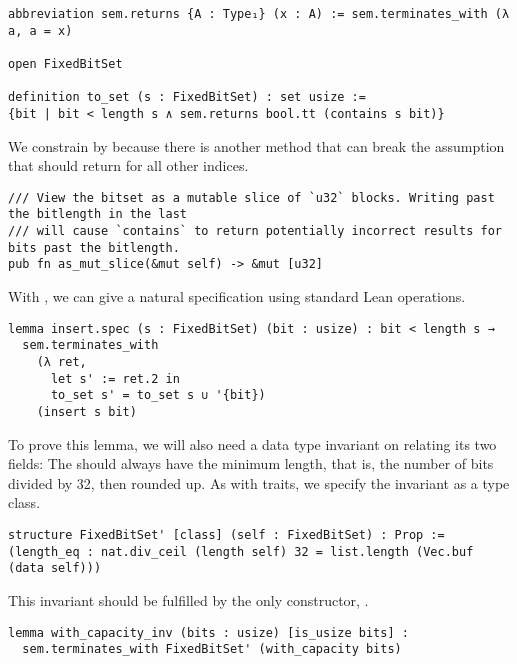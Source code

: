 \begin{verbatim}
abbreviation sem.returns {A : Type₁} (x : A) := sem.terminates_with (λ a, a = x)

open FixedBitSet

definition to_set (s : FixedBitSet) : set usize :=
{bit | bit < length s ∧ sem.returns bool.tt (contains s bit)}
\end{verbatim}

We constrain  by  because there is another method
that can break the assumption that  should return 
for all other indices.

\begin{verbatim}
/// View the bitset as a mutable slice of `u32` blocks. Writing past the bitlength in the last
/// will cause `contains` to return potentially incorrect results for bits past the bitlength.
pub fn as_mut_slice(&mut self) -> &mut [u32]
\end{verbatim}

With , we can give  a natural specification using
standard Lean  operations.

\begin{verbatim}
lemma insert.spec (s : FixedBitSet) (bit : usize) : bit < length s →
  sem.terminates_with
    (λ ret,
      let s' := ret.2 in
      to_set s' = to_set s ∪ '{bit})
    (insert s bit)
\end{verbatim}

To prove this lemma, we will also need a data type invariant on  relating its two
fields: The  should always have the minimum length, that is, the
number of bits divided by 32, then rounded up. As with traits, we specify the
invariant as a type class.

\begin{verbatim}
structure FixedBitSet' [class] (self : FixedBitSet) : Prop :=
(length_eq : nat.div_ceil (length self) 32 = list.length (Vec.buf (data self)))
\end{verbatim}

This invariant should be fulfilled by the only constructor, .

\begin{verbatim}
lemma with_capacity_inv (bits : usize) [is_usize bits] :
  sem.terminates_with FixedBitSet' (with_capacity bits)
\end{verbatim}

